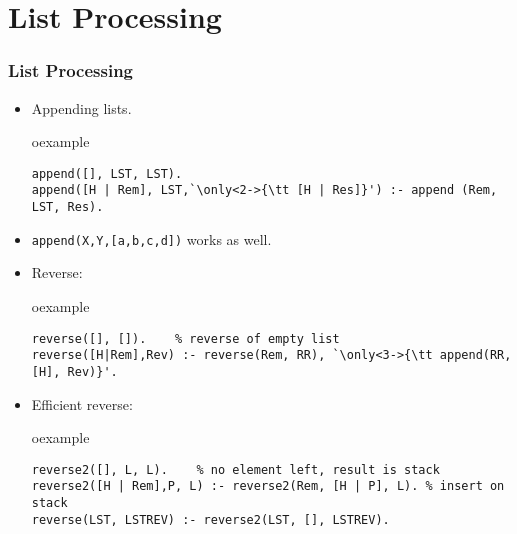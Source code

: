 \section{List Processing}
\begin{frame}[fragile]
\frametitle{List Processing}
\begin{itemize}
\item Appending lists.\\
\begin{beamercolorbox}{oexample}
\begin{lstlisting}[escapeinside=`']
append([], LST, LST).  
append([H | Rem], LST,`\only<2->{\tt [H | Res]}') :- append (Rem, LST, Res).      
\end{lstlisting}
\end{beamercolorbox}
\item \lstinline!append(X,Y,[a,b,c,d])! works as well.
\item Reverse:\\
\begin{beamercolorbox}{oexample}
\begin{lstlisting}[escapeinside=`']
reverse([], []).    % reverse of empty list
reverse([H|Rem],Rev) :- reverse(Rem, RR), `\only<3->{\tt append(RR,[H], Rev)}'.
\end{lstlisting}
\end{beamercolorbox}
\item Efficient reverse:\\
\begin{beamercolorbox}{oexample}
\begin{lstlisting}[escapeinside=`']
reverse2([], L, L).    % no element left, result is stack
reverse2([H | Rem],P, L) :- reverse2(Rem, [H | P], L). % insert on stack
reverse(LST, LSTREV) :- reverse2(LST, [], LSTREV).
\end{lstlisting}
\end{beamercolorbox}
\end{itemize}
\end{frame}

